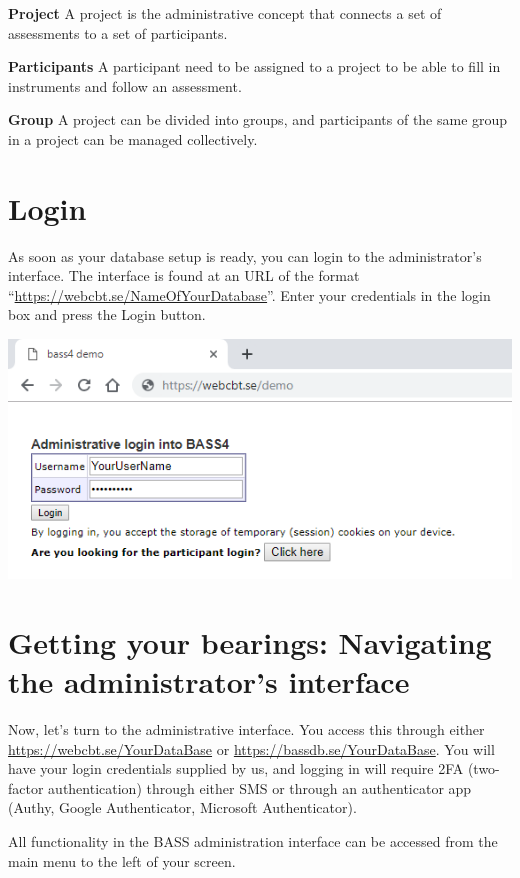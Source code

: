 \documentclass[]{book}
\begin{document}
\textbf{Project}
A project is the administrative concept that connects a set of assessments to a set of participants.

\textbf{Participants}
A participant need to be assigned to a project to be able to fill in instruments and follow an assessment.

\textbf{Group}
A project can be divided into groups, and participants of the same group in a project can be managed collectively.

\hypertarget{login}{%
\chapter{Login}\label{login}}

As soon as your database setup is ready, you can login to the administrator's interface. The interface is found at an URL of the format ``\url{https://webcbt.se/NameOfYourDatabase}''. Enter your credentials in the login box and press the Login button.

\includegraphics{images/login.png}

\hypertarget{getting-your-bearings-navigating-the-administrators-interface}{%
\chapter{Getting your bearings: Navigating the administrator's interface}\label{getting-your-bearings-navigating-the-administrators-interface}}

Now, let's turn to the administrative interface. You access this through either \url{https://webcbt.se/YourDataBase} or \url{https://bassdb.se/YourDataBase}. You will have your login credentials supplied by us, and logging in will require 2FA (two-factor authentication) through either SMS or through an authenticator app (Authy, Google Authenticator, Microsoft Authenticator).

All functionality in the BASS administration interface can be accessed from the main menu to the left of your screen.
\end{document}
